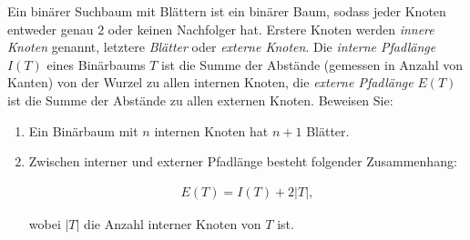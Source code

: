 
\begin{exercise}

Ein binärer Suchbaum mit Blättern ist ein binärer Baum, sodass jeder Knoten entweder genau $2$ oder keinen Nachfolger hat.
Erstere Knoten werden \textit{innere Knoten} genannt, letztere \textit{Blätter} oder \textit{externe Knoten}.
Die \textit{interne Pfadlänge} $I(T)$ eines Binärbaums $T$ ist die Summe der Abstände (gemessen in Anzahl von Kanten) von der Wurzel zu allen internen Knoten, die \textit{externe Pfadlänge} $E(T)$ ist die Summe der Abstände zu allen externen Knoten.
Beweisen Sie:

\begin{enumerate}[label = \alph*]

    \item Ein Binärbaum mit $n$ internen Knoten hat $n + 1$ Blätter.

    \item Zwischen interner und externer Pfadlänge besteht folgender Zusammenhang:
    
    \begin{align*}
        E(T) = I(T) + 2 |T|,
    \end{align*}

    wobei $|T|$ die Anzahl interner Knoten von $T$ ist.

\end{enumerate}

\end{exercise}



